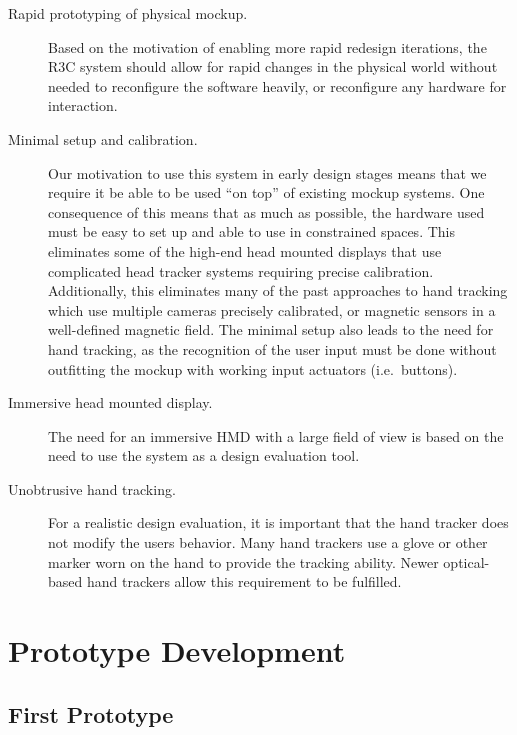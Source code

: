 \begin{description}
    \item [Rapid prototyping of physical mockup.]
        Based on the motivation of enabling more rapid redesign iterations, the R3C system should allow for rapid changes in the physical world without needed to reconfigure the software heavily, or reconfigure any hardware for interaction.
    \item [Minimal setup and calibration.]
        Our motivation to use this system in early design stages means that we require it be able to be used ``on top'' of existing mockup systems.
        One consequence of this means that as much as possible, the hardware used must be easy to set up and able to use in constrained spaces.
        This eliminates some of the high-end head mounted displays that use complicated head tracker systems requiring precise calibration.
        Additionally, this eliminates many of the past approaches to hand tracking which use multiple cameras precisely calibrated, or magnetic sensors in a well-defined magnetic field.
        The minimal setup also leads to the need for hand tracking, as the recognition of the user input must be done without outfitting the mockup with working input actuators (i.e.\ buttons).
    \item [Immersive head mounted display.]
        The need for an immersive HMD with a large field of view is based on the need to use the system as a design evaluation tool.
    \item [Unobtrusive hand tracking.]
        For a realistic design evaluation, it is important that the hand tracker does not modify the users behavior.
        Many hand trackers use a glove or other marker worn on the hand to provide the tracking ability.
        Newer optical-based hand trackers allow this requirement to be fulfilled.

\end{description}

\section{Prototype Development}

\subsection{First Prototype}


